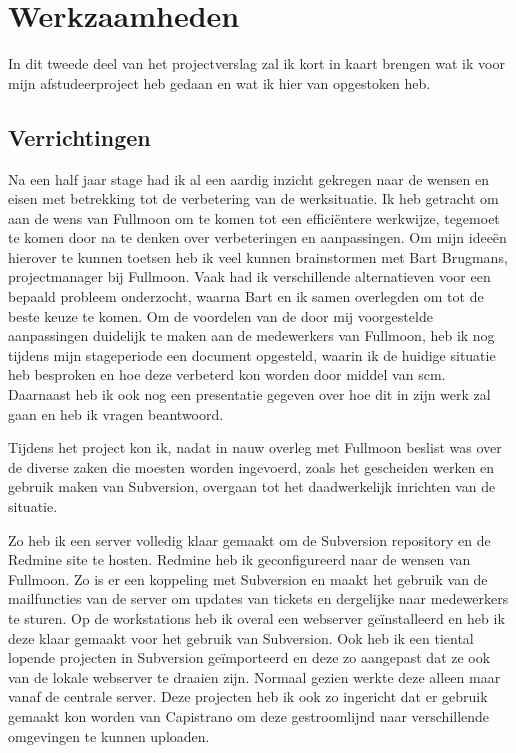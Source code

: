 \chapter{Werkzaamheden}

In dit tweede deel van het projectverslag zal ik kort in kaart brengen wat ik voor mijn afstudeerproject heb gedaan en wat ik hier van opgestoken heb.

\section{Verrichtingen}

Na een half jaar stage had ik al een aardig inzicht gekregen naar de wensen en eisen met betrekking tot de verbetering van de werksituatie. Ik heb getracht om aan de wens van Fullmoon om te komen tot een efficiëntere werkwijze, tegemoet te komen door na te denken over verbeteringen en aanpassingen. Om mijn ideeën hierover te kunnen toetsen heb ik veel kunnen brainstormen met Bart Brugmans, projectmanager bij Fullmoon. Vaak had ik verschillende alternatieven voor een bepaald probleem onderzocht, waarna Bart en ik samen overlegden om tot de beste keuze te komen. Om de voordelen van de door mij voorgestelde aanpassingen duidelijk te maken aan de medewerkers van Fullmoon, heb ik nog tijdens mijn stageperiode een document opgesteld, waarin ik de huidige situatie heb besproken en hoe deze verbeterd kon worden door middel van {\sc scm}. Daarnaast heb ik ook nog een presentatie gegeven over hoe dit in zijn werk zal gaan en heb ik vragen beantwoord. 

Tijdens het project kon ik, nadat in nauw overleg met Fullmoon beslist was over de diverse zaken die moesten worden ingevoerd, zoals het gescheiden werken en gebruik maken van Subversion, overgaan tot het daadwerkelijk inrichten van de situatie.

Zo heb ik een server volledig klaar gemaakt om de Subversion repository en de Redmine site te hosten. Redmine heb ik geconfigureerd naar de wensen van Fullmoon. Zo is er een koppeling met Subversion en maakt het gebruik van de mailfuncties van de server om updates van tickets en dergelijke naar medewerkers te sturen. Op de workstations heb ik overal een webserver geïnstalleerd en heb ik deze klaar gemaakt voor het gebruik van Subversion. Ook heb ik een tiental lopende projecten in Subversion geïmporteerd en deze zo aangepast dat ze ook van de lokale webserver te draaien zijn. Normaal gezien werkte deze alleen maar vanaf de centrale server. Deze projecten heb ik ook zo ingericht dat er gebruik gemaakt kon worden van Capistrano om deze gestroomlijnd naar verschillende omgevingen te kunnen uploaden.

